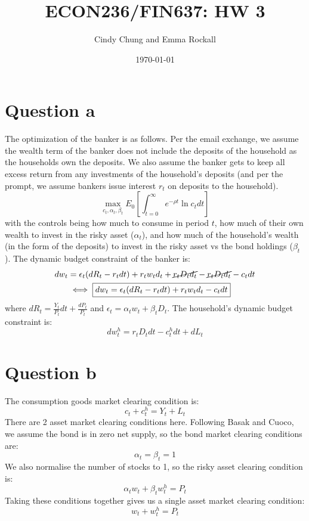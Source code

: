 \documentclass{article}
\title{ECON236/FIN637: HW 3}
\author{Cindy Chung and Emma Rockall}
\date{\today}
\begin{document}
\maketitle

\section*{Question a}
The optimization of the banker is as follows. Per the email exchange, we assume the wealth term of the banker does not include the deposits of the household as the households own the deposits. We also assume the banker gets to keep all excess return from any investments of the household's deposits (and per the prompt, we assume bankers issue interest $r_t$ on deposits to the household).
\[
\max_{c_t, \alpha_t, \beta_t} E_{0}\left[\int_{t=0}^{\infty} e^{-\rho t} \ln c_{t} d t\right]
\]
with the controls being how much to consume in period $t$, how much of their own wealth to invest in the risky asset ($\alpha_t$), and how much of the household's wealth (in the form of the deposits) to invest in the risky asset vs the bond holdings ($\beta_t$). The dynamic budget constraint of the banker is:
\[ \begin{aligned}
    d w_t &= \epsilon_t (d R_t - r_t d t)  + r_t w_t d_t + \cancel{r_t D_t d_t} - \cancel{r_t D_t d_t} - c_t d t \\
    & \iff \boxed{d w_t= \epsilon_t (d R_t - r_t d t)  + r_t w_t d_t - c_t d t }
\end{aligned} \]
where $\boxed{d R_t = \frac{Y_t}{P_t} d t + \frac{d P_t}{P_t}}$ and $\boxed{\epsilon_t = \alpha_tw_t + \beta_tD_t}$.
The household's dynamic budget constraint is:
\[
\boxed{d w_t^h = r_t D_t d t  - c_t^h d t + d L_t}  
\]
\section*{Question b}
The consumption goods market clearing condition is:
\[
\boxed{c_t + c_t^h = Y_t + L_t    }
\]
There are 2 asset market clearing conditions here. Following Basak and Cuoco, we assume the bond is in zero net supply, so the bond market clearing conditions are:
\[
\alpha_t=\beta_t=1
\]
We also normalise the number of stocks to 1, so the risky asset clearing condition is:
\[
\alpha_tw_t + \beta_tw^h_t = P_t
\]
Taking these conditions together gives us a single asset market clearing condition:
\[
\boxed{w_t + w_t^h = P_t    }
\]
\end{document}
